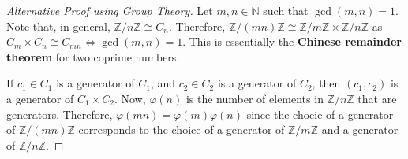 \documentclass[a4paper]{article}
\theoremstyle{definition}
\begin{document}
\begin{proof}[Alternative Proof using Group Theory]
    Let $m,n \in \mathbb{N}$ such that $\gcd(m,n) = 1$.
    Note that, in general, $\mathbb{Z}/n\mathbb{Z} \cong C_n$.
    Therefore, $\mathbb{Z}/(mn)\mathbb{Z} \cong \mathbb{Z}/m\mathbb{Z} \times \mathbb{Z}/n\mathbb{Z}$ as $C_m \times C_n \cong C_{mn} \iff \gcd(m,n) = 1$.
    This is essentially the \textbf{Chinese remainder theorem} for two coprime numbers.

    If $c_1 \in C_1$ is a generator of $C_1$, and $c_2 \in C_2$ is a generator of $C_2$, then $(c_1, c_2)$ is a generator of $C_1 \times C_2$.
    Now, $\varphi(n)$ is the number of elements in $\mathbb{Z}/n\mathbb{Z}$ that are generators.
    Therefore, $\varphi(mn) = \varphi(m)\varphi(n)$ since the chocie of a generator of $\mathbb{Z}/(mn)\mathbb{Z}$ corresponds to the choice of a generator of $\mathbb{Z}/m\mathbb{Z}$ and a generator of $\mathbb{Z}/n\mathbb{Z}$.
\end{proof}
\end{document}
